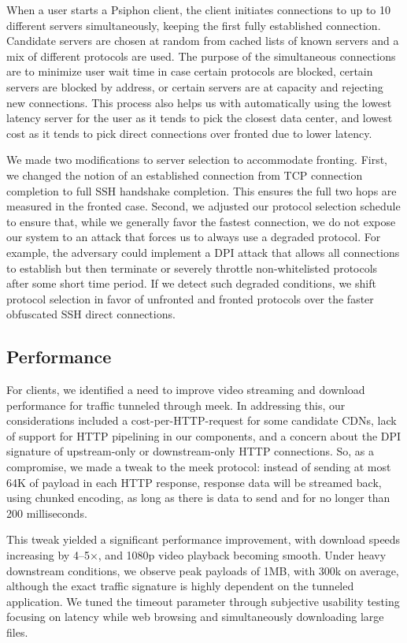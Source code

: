 \documentclass{sig-alternate}
\begin{document}
When a user starts a Psiphon client, the client initiates connections to up
to 10 different servers simultaneously, keeping the first fully established
connection. Candidate servers are chosen at random from cached lists of
known servers and a mix of different protocols are used. The purpose of the
simultaneous connections are to minimize user wait time in case certain
protocols are blocked, certain servers are blocked by address, or certain
servers are at capacity and rejecting new connections. This process also
helps us with automatically using the lowest latency server for the user as
it tends to pick the closest data center, and lowest cost as it tends to
pick direct connections over fronted due to lower latency.

We made two modifications to server selection to accommodate fronting.
First, we changed the notion of an established connection from TCP
connection completion to full SSH handshake completion. This ensures the
full two hops are measured in the fronted case. Second, we adjusted our
protocol selection schedule to ensure that, while we generally favor the
fastest connection, we do not expose our system to an attack that forces us
to always use a degraded protocol. For example, the adversary could
implement a DPI attack that allows all connections to establish but then
terminate or severely throttle non-whitelisted protocols after some short
time period. If we detect such degraded conditions, we shift protocol
selection in favor of unfronted and fronted protocols over the faster
obfuscated SSH direct connections.

\subsection{Performance}

For clients, we identified a need to improve video streaming and download
performance for traffic tunneled through meek. In addressing this, our
considerations included a cost-per-HTTP-request for some candidate CDNs,
lack of support for HTTP pipelining in our components, and a concern about
the DPI signature of upstream-only or downstream-only HTTP connections. So,
as a compromise, we made a tweak to the meek protocol: instead of sending
at most 64K of payload in each HTTP response, response data will be
streamed back, using chunked encoding, as long as there is data to send and
for no longer than 200 milliseconds.

This tweak yielded a significant performance improvement, with download
speeds increasing by 4--5×, and 1080p video playback becoming smooth. Under
heavy downstream conditions, we observe peak payloads of 1MB, with 300k on
average, although the exact traffic signature is highly dependent on the
tunneled application. We tuned the timeout parameter through subjective
usability testing focusing on latency while web browsing and simultaneously
downloading large files.
\end{document}
